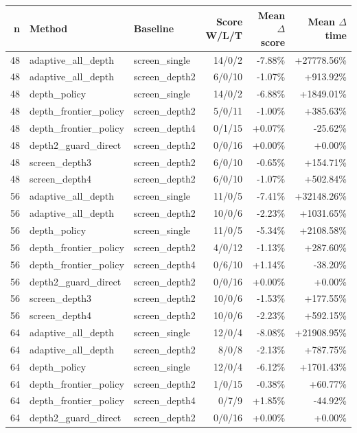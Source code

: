 \begin{tabular}{rllrrr}
\toprule
n & Method & Baseline & Score W/L/T & Mean $\Delta$ score & Mean $\Delta$ time \\
\midrule
48 & adaptive_all_depth & screen_single & 14/0/2 & -7.88\% & +27778.56\% \\
48 & adaptive_all_depth & screen_depth2 & 6/0/10 & -1.07\% & +913.92\% \\
48 & depth_policy & screen_single & 14/0/2 & -6.88\% & +1849.01\% \\
48 & depth_frontier_policy & screen_depth2 & 5/0/11 & -1.00\% & +385.63\% \\
48 & depth_frontier_policy & screen_depth4 & 0/1/15 & +0.07\% & -25.62\% \\
48 & depth2_guard_direct & screen_depth2 & 0/0/16 & +0.00\% & +0.00\% \\
48 & screen_depth3 & screen_depth2 & 6/0/10 & -0.65\% & +154.71\% \\
48 & screen_depth4 & screen_depth2 & 6/0/10 & -1.07\% & +502.84\% \\
56 & adaptive_all_depth & screen_single & 11/0/5 & -7.41\% & +32148.26\% \\
56 & adaptive_all_depth & screen_depth2 & 10/0/6 & -2.23\% & +1031.65\% \\
56 & depth_policy & screen_single & 11/0/5 & -5.34\% & +2108.58\% \\
56 & depth_frontier_policy & screen_depth2 & 4/0/12 & -1.13\% & +287.60\% \\
56 & depth_frontier_policy & screen_depth4 & 0/6/10 & +1.14\% & -38.20\% \\
56 & depth2_guard_direct & screen_depth2 & 0/0/16 & +0.00\% & +0.00\% \\
56 & screen_depth3 & screen_depth2 & 10/0/6 & -1.53\% & +177.55\% \\
56 & screen_depth4 & screen_depth2 & 10/0/6 & -2.23\% & +592.15\% \\
64 & adaptive_all_depth & screen_single & 12/0/4 & -8.08\% & +21908.95\% \\
64 & adaptive_all_depth & screen_depth2 & 8/0/8 & -2.13\% & +787.75\% \\
64 & depth_policy & screen_single & 12/0/4 & -6.12\% & +1701.43\% \\
64 & depth_frontier_policy & screen_depth2 & 1/0/15 & -0.38\% & +60.77\% \\
64 & depth_frontier_policy & screen_depth4 & 0/7/9 & +1.85\% & -44.92\% \\
64 & depth2_guard_direct & screen_depth2 & 0/0/16 & +0.00\% & +0.00\% \\

\end{tabular}
